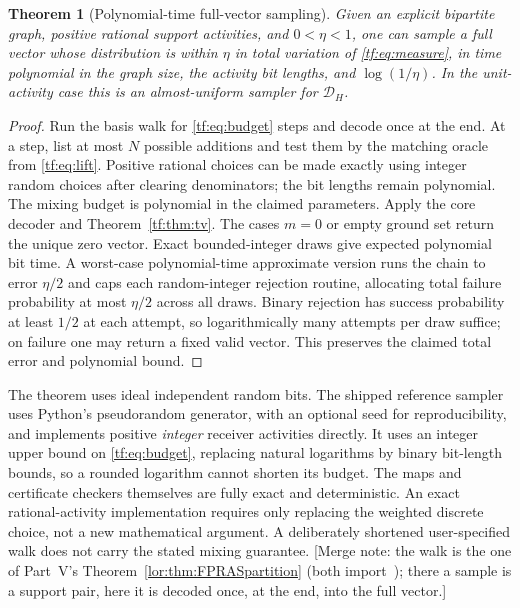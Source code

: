 \documentclass[11pt]{article}
\numberwithin{equation}{section}
\newtheorem{theorem}{Theorem}[section]
\theoremstyle{definition}
\newcommand{\cD}{\mathcal D}
\begin{document}
\begin{theorem}[Polynomial-time full-vector sampling]
\label{tf:thm:sampler}
Given an explicit bipartite graph, positive rational support activities,
and $0<\eta<1$, one can sample a full vector whose distribution is within
$\eta$ in total variation of \eqref{tf:eq:measure}, in time polynomial in
the graph size, the activity bit lengths, and $\log(1/\eta)$.
In the unit-activity case this is an almost-uniform sampler for $\cD_H$.
\end{theorem}
\begin{proof}
Run the basis walk for \eqref{tf:eq:budget} steps and decode once at the end.
At a step, list at most $N$ possible additions and test them by the
matching oracle from \eqref{tf:eq:lift}. Positive rational choices can be
made exactly using integer random choices after clearing denominators;
the bit lengths remain polynomial. The mixing budget is polynomial in the
claimed parameters. Apply the core decoder and Theorem~\ref{tf:thm:tv}.
The cases $m=0$ or empty ground set return the unique zero vector.
Exact bounded-integer draws give expected polynomial bit time. A worst-case
polynomial-time approximate version runs the chain to error $\eta/2$ and
caps each random-integer rejection routine, allocating total failure
probability at most $\eta/2$ across all draws. Binary rejection has
success probability at least $1/2$ at each attempt, so logarithmically
many attempts per draw suffice; on failure one may return a fixed valid
vector. This preserves the claimed total error and polynomial bound.
\end{proof}

The theorem uses ideal independent random bits. The shipped reference
sampler uses Python's pseudorandom generator, with an optional seed for
reproducibility, and implements positive \emph{integer} receiver
activities directly. It uses an integer upper bound on
\eqref{tf:eq:budget}, replacing natural logarithms by binary bit-length
bounds, so a rounded logarithm cannot shorten its budget. The maps and
certificate checkers themselves are
fully exact and deterministic. An exact rational-activity implementation
requires only replacing the weighted discrete choice, not a new
mathematical argument. A deliberately shortened user-specified walk does
not carry the stated mixing guarantee.
[Merge note: the walk is the one of Part~V's
Theorem~\ref{lor:thm:FPRASpartition} (both import~\cite{ALOV}); there a
sample is a support pair, here it is decoded once, at the end, into the
full vector.]
\end{document}
